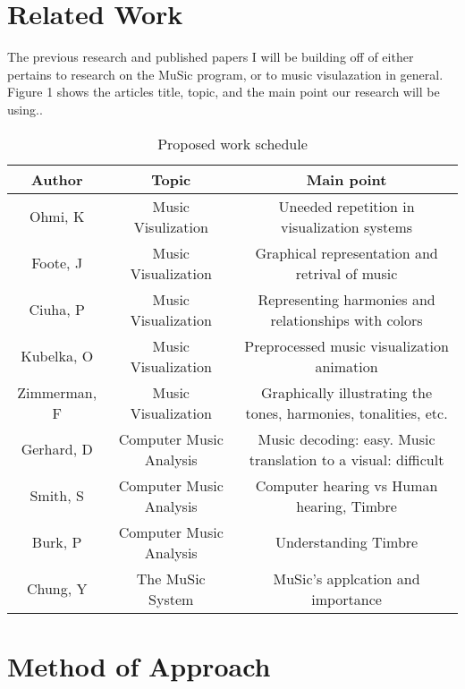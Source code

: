 \documentclass[11pt]{article}
\begin{document}
\vspace*{-.1in}
\section{Related Work}
\label{sec:relatedwork}
\vspace*{-.1in}


The previous research and published papers I will be building off of either pertains to research on the MuSic program, or to music visulazation in general. Figure 1 shows the articles title, topic, and the main point our research will be using.\cite{conrad-gecco-selection-study}.
\begin{table}[htbp]
\centering
\begin{tabular}{|c||c|c|}
\hline
\bf Author & \bf Topic & \bf Main point\\\hline\hline
Ohmi, K & Music Visulization & Uneeded repetition in visualization systems\\\hline
Foote, J & Music Visualization & Graphical representation and retrival of music\\\hline
Ciuha, P & Music Visualization & Representing harmonies and relationships with colors\\\hline
Kubelka, O & Music Visualization & Preprocessed music visualization animation\\\hline
Zimmerman, F & Music Visualization & Graphically illustrating the tones, harmonies, tonalities, etc.\\\hline
Gerhard, D & Computer Music Analysis & Music decoding: easy. Music translation to a visual: difficult\\\hline
Smith, S & Computer Music Analysis & Computer hearing vs Human hearing, Timbre\\\hline
Burk, P & Computer Music Analysis & Understanding Timbre\\\hline
Chung, Y & The MuSic System & MuSic's applcation and importance\\\hline
\end{tabular}
\caption{Proposed work schedule}
\label{intro-tab1}
\end{table}

\vspace*{-.2in}
\section{Method of Approach}
\label{sec:method}
\vspace*{-.1in}
\end{document}
